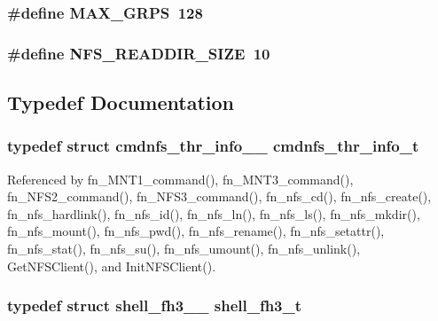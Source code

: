 \subsubsection{\setlength{\rightskip}{0pt plus 5cm}\#define MAX\_\-GRPS\ 128}\label{commands__NFS_8c_a1}


\subsubsection{\setlength{\rightskip}{0pt plus 5cm}\#define NFS\_\-READDIR\_\-SIZE\ 10}\label{commands__NFS_8c_a0}




\subsection{Typedef Documentation}
\subsubsection{\setlength{\rightskip}{0pt plus 5cm}typedef struct {\bf cmdnfs\_\-thr\_\-info\_\-\_\-}  {\bf cmdnfs\_\-thr\_\-info\_\-t}}\label{commands__NFS_8c_a11}




Referenced by fn\_\-MNT1\_\-command(), fn\_\-MNT3\_\-command(), fn\_\-NFS2\_\-command(), fn\_\-NFS3\_\-command(), fn\_\-nfs\_\-cd(), fn\_\-nfs\_\-create(), fn\_\-nfs\_\-hardlink(), fn\_\-nfs\_\-id(), fn\_\-nfs\_\-ln(), fn\_\-nfs\_\-ls(), fn\_\-nfs\_\-mkdir(), fn\_\-nfs\_\-mount(), fn\_\-nfs\_\-pwd(), fn\_\-nfs\_\-rename(), fn\_\-nfs\_\-setattr(), fn\_\-nfs\_\-stat(), fn\_\-nfs\_\-su(), fn\_\-nfs\_\-umount(), fn\_\-nfs\_\-unlink(), Get\-NFSClient(), and Init\-NFSClient().
\subsubsection{\setlength{\rightskip}{0pt plus 5cm}typedef struct {\bf shell\_\-fh3\_\-\_\-}  {\bf shell\_\-fh3\_\-t}}\label{commands__NFS_8c_a3}




